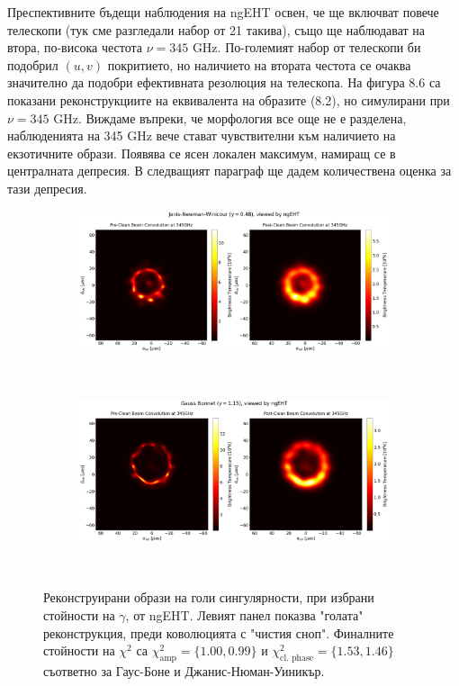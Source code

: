 \documentclass[12pt]{article}
\numberwithin{equation}{section}
\numberwithin{figure}{section}
\begin{document}
	Преспективните бъдещи наблюдения на ngEHT освен, че ще включват повече телескопи (тук сме разгледали набор от 21 такива), също ще наблюдават на втора, по-висока честота $\nu = 345$ GHz. По-големият набор от телескопи би подобрил $(u,v)$ покритието, но наличието на втората честота се очаква значително да подобри ефективната резолюция на телескопа. На фигура 8.6 са показани реконструкциите на еквивалента на образите (8.2), но симулирани при $\nu  =345$ GHz. Виждаме въпреки, че морфология все още не е разделена, наблюденията на 345 GHz вече стават чувствителни към наличието на екзотичните образи. Появява се ясен локален максимум, намиращ се в централната депресия. В следващият параграф ще дадем количествена оценка за тази депресия.
	
	\begin{figure}[h!]
		\centering
		\begin{subfigure}{12cm}
			\hspace{-1.5cm}
			\includegraphics[scale = 0.23]{Section_8_Observing_Horizonless_Objects/Ehtim_plot_ngEHT_no_blur_345_JNW.png}
		\end{subfigure}\\
		\begin{subfigure}{12cm}
			\hspace{-1.5cm}
			\includegraphics[scale = 0.23]{Section_8_Observing_Horizonless_Objects/Ehtim_plot_ngEHT_no_blur_345_GB.png}
		\end{subfigure}\\
		\label{Naked_Singularity_EHT_ng2017}
		\caption[Реконструирани образи на голи сингулярности, при избрани стойности на $\gamma$, от ngEHT]{\small Реконструирани образи на голи сингулярности, при избрани стойности на $\gamma$, от ngEHT. Левият панел показва "голата"$\,$ реконструкция, преди коволюцията с "чистия сноп". Финалните стойности на $\chi^2$ са $\chi^2_\text{amp} = \{1.00, 0.99\}$ и $\chi^2_\text{cl. phase} = \{1.53, 1.46\}$ съответно за Гаус-Боне и Джанис-Нюман-Уиникър.} 
	\end{figure}
	
\end{document}
